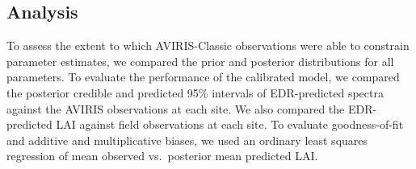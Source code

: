 \subsection{Analysis}

To assess the extent to which AVIRIS-Classic observations were able to constrain parameter estimates, we compared the prior and posterior distributions for all parameters.
To evaluate the performance of the calibrated model, we compared the posterior credible and predicted 95\% intervals of EDR-predicted spectra against the AVIRIS observations at each site.
We also compared the EDR-predicted LAI against field observations at each site.
To evaluate goodness-of-fit and additive and multiplicative biases, we used an ordinary least squares regression of mean observed vs.\ posterior mean predicted LAI.
